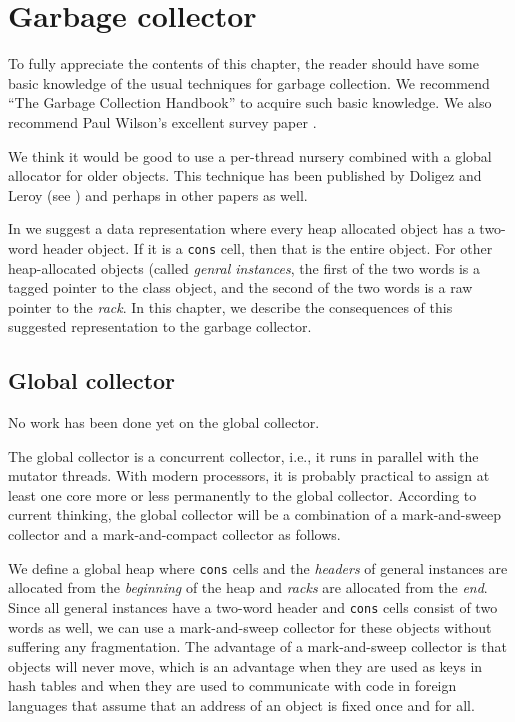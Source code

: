 \chapter{Garbage collector}

To fully appreciate the contents of this chapter, the reader should
have some basic knowledge of the usual techniques for garbage
collection.  We recommend ``The Garbage Collection Handbook''
\cite{Jones:2011:GCH:2025255} to acquire such basic knowledge.  We
also recommend Paul Wilson's excellent survey paper
\cite{Wilson:1992:UGC:645648.664824}.

We think it would be good to use a per-thread nursery combined with a
global allocator for older objects.  This technique has been published
by Doligez and Leroy (see \cite{Doligez:1993:CGG:158511.158611}) and
perhaps in other papers as well.

In  we suggest a data representation
where every heap allocated object has a two-word header object.  If it
is a \texttt{cons} cell, then that is the entire object.  For other
heap-allocated objects (called \emph{genral instances}, the first of
the two words is a tagged pointer to the class object, and the second
of the two words is a raw pointer to the \emph{rack}.  In
this chapter, we describe the consequences of this suggested
representation to the garbage collector.

\section{Global collector}
No work has been done yet on the global collector.  

The global collector is a concurrent collector, i.e., it runs in
parallel with the mutator threads.  With modern processors, it is
probably practical to assign at least one core more or less
permanently to the global collector.  According to current thinking,
the global collector will be a combination of a mark-and-sweep
collector and a mark-and-compact collector as follows.  

We define a global heap where \texttt{cons} cells and the
\emph{headers} of general instances are allocated from the
\emph{beginning} of the heap and \emph{racks} are allocated from the
\emph{end}.  Since all general instances have a two-word header and
\texttt{cons} cells consist of two words as well, we can use a
mark-and-sweep collector for these objects without suffering any
fragmentation.  The advantage of a mark-and-sweep collector is that
objects will never move, which is an advantage when they are used as
keys in hash tables and when they are used to communicate with
code in foreign languages that assume that an address of an object is
fixed once and for all.

